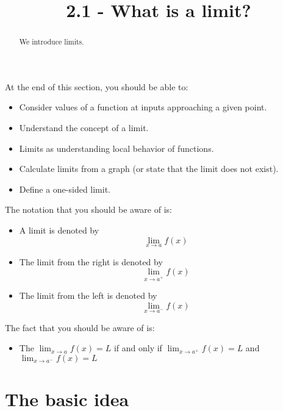 \documentclass{ximera}
\title{2.1 - What is a limit?}
\begin{document}
\begin{abstract}
  We introduce limits.
\end{abstract}
\maketitle


At the end of this section, you should be able to:
\begin{itemize}
    \item {Consider  values of a function  at inputs approaching a given point.}
    \item {Understand the concept of a limit.}
      \item {Limits as understanding local behavior of functions.}
      \item {Calculate limits from a graph (or state that the limit does not exist).}
    \item {Define a one-sided limit.}
    
  
\end{itemize}

The notation that you should be aware of is:
\begin{itemize}
    \item A limit is denoted by
    $$\lim_{x\to a} f(x)$$
    \item The limit from the right is denoted by
    $$\lim_{x\to a^+} f(x)$$
    \item The limit from the left is denoted by
    $$\lim_{x\to a^-} f(x)$$
\end{itemize}

The fact that you should be aware of is:
\begin{itemize}
    \item The $\lim_{x\to a} f(x)=L$ if and only if $\lim_{x\to a^+} f(x)=L$ and $\lim_{x\to a^-} f(x)=L$
\end{itemize}

\section{The basic idea}
\end{document}
